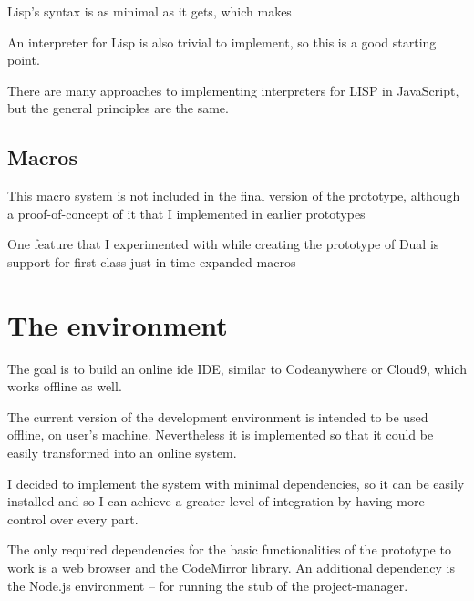 Lisp's syntax is as minimal as it gets\cite{syntaxation}, which makes 

An interpreter for Lisp is also trivial to implement, so this is a good starting
point.

There are many approaches to implementing interpreters for LISP in
JavaScript\cite{js_lisps}, but the general principles are the same.

\subsection{Macros}
This
macro system is not included in the final version of the prototype, although a
proof-of-concept of it that I implemented in earlier prototypes


One feature that I experimented with while creating the prototype of Dual is
support for first-class just-in-time expanded macros

\section{The environment}

The goal is to build an online \acrlong{ide} IDE, similar to
Codeanywhere\cite{codeanywhere_website} or
Cloud9\cite{c9_website}, which works offline as well.

The current version of the development environment is intended to be used
offline, on user's machine. Nevertheless it is implemented so that it could be
easily transformed into an online system.

I decided to implement the system with minimal dependencies, so it can be easily
installed and so I can achieve a greater level of integration by having more
control over every part.

The only required dependencies for the basic functionalities of the prototype to
work is a web browser and the CodeMirror library. An additional dependency is the Node.js environment -- for running the stub of the project-manager.

